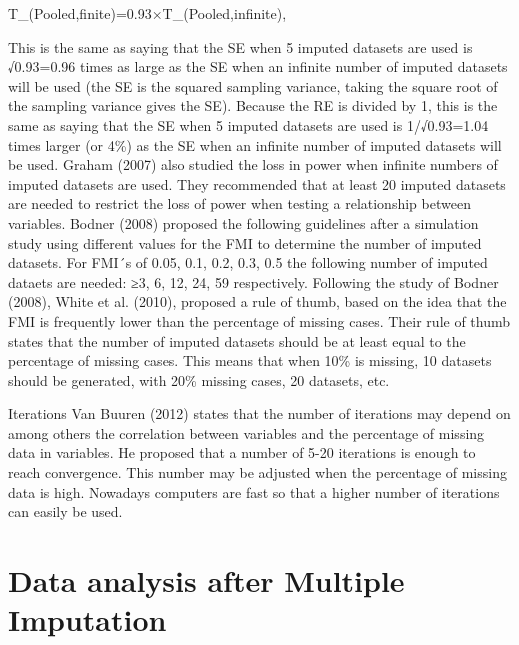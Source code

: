 \documentclass[]{book}
\theoremstyle{definition}
\theoremstyle{definition}
\theoremstyle{definition}
\theoremstyle{remark}
\begin{document}
T\_(Pooled,finite)=0.93×T\_(Pooled,infinite),

This is the same as saying that the SE when 5 imputed datasets are used
is √0.93=0.96 times as large as the SE when an infinite number of
imputed datasets will be used (the SE is the squared sampling variance,
taking the square root of the sampling variance gives the SE). Because
the RE is divided by 1, this is the same as saying that the SE when 5
imputed datasets are used is 1/√0.93=1.04 times larger (or 4\%) as the
SE when an infinite number of imputed datasets will be used. Graham
(2007) also studied the loss in power when infinite numbers of imputed
datasets are used. They recommended that at least 20 imputed datasets
are needed to restrict the loss of power when testing a relationship
between variables. Bodner (2008) proposed the following guidelines after
a simulation study using different values for the FMI to determine the
number of imputed datasets. For FMI´s of 0.05, 0.1, 0.2, 0.3, 0.5 the
following number of imputed dataets are needed: ≥3, 6, 12, 24, 59
respectively. Following the study of Bodner (2008), White et al. (2010),
proposed a rule of thumb, based on the idea that the FMI is frequently
lower than the percentage of missing cases. Their rule of thumb states
that the number of imputed datasets should be at least equal to the
percentage of missing cases. This means that when 10\% is missing, 10
datasets should be generated, with 20\% missing cases, 20 datasets, etc.

Iterations Van Buuren (2012) states that the number of iterations may
depend on among others the correlation between variables and the
percentage of missing data in variables. He proposed that a number of
5-20 iterations is enough to reach convergence. This number may be
adjusted when the percentage of missing data is high. Nowadays computers
are fast so that a higher number of iterations can easily be used.

\chapter{Data analysis after Multiple
Imputation}\label{data-analysis-after-multiple-imputation}
\end{document}
